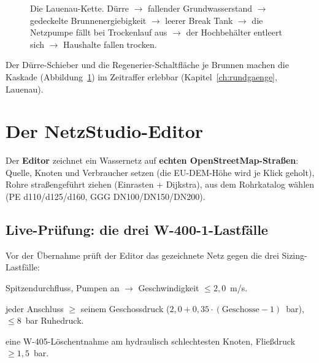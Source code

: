 \documentclass[11pt,a4paper,parskip=half]{scrreprt}
\newcommand{\ui}[1]{\textsf{\bfseries #1}}      %
\begin{document}
\begin{figure}[t]
\centering
{}
\caption{Die Lauenau-Kette. Dürre $\to$ fallender Grundwasserstand $\to$
gedeckelte Brunnenergiebigkeit $\to$ leerer Break Tank $\to$ die Netzpumpe fällt
bei Trockenlauf aus $\to$ der Hochbehälter entleert sich $\to$ Haushalte fallen
trocken.}
\label{fig:kaskade}
\end{figure}

Der Dürre-Schieber und die Regenerier-Schaltfläche je Brunnen machen die Kaskade
(Abbildung~\ref{fig:kaskade}) im Zeitraffer erlebbar (Kapitel~\ref{ch:rundgaenge},
Lauenau).

\chapter{Der NetzStudio-Editor}
\label{ch:editor}

Der \ui{Editor} zeichnet ein Wassernetz auf \textbf{echten OpenStreetMap-Straßen}:
Quelle, Knoten und Verbraucher setzen (die EU-DEM-Höhe wird je Klick geholt),
Rohre straßengeführt ziehen (Einrasten + Dijkstra), aus dem Rohrkatalog wählen
(PE d110/d125/d160, GGG DN100/DN150/DN200).

\section{Live-Prüfung: die drei W-400-1-Lastfälle}
Vor der Übernahme prüft der Editor das gezeichnete Netz gegen die drei
Sizing-Lastfälle:

\begin{description}[leftmargin=1.2em]
\item[LF1 Maximale Förderung] Spitzendurchfluss, Pumpen an $\to$ Geschwindigkeit
  $\le2{,}0$~m/s.
\item[LF2 Spitzenstunde Maximaltag] jeder Anschluss $\ge$ seinem Geschossdruck
  ($2{,}0+0{,}35\cdot(\text{Geschosse}-1)$~bar), $\le8$~bar Ruhedruck.
\item[LF3 Löschfall] eine W-405-Löschentnahme am hydraulisch schlechtesten Knoten,
  Fließdruck $\ge1{,}5$~bar.
\end{description}
\end{document}
